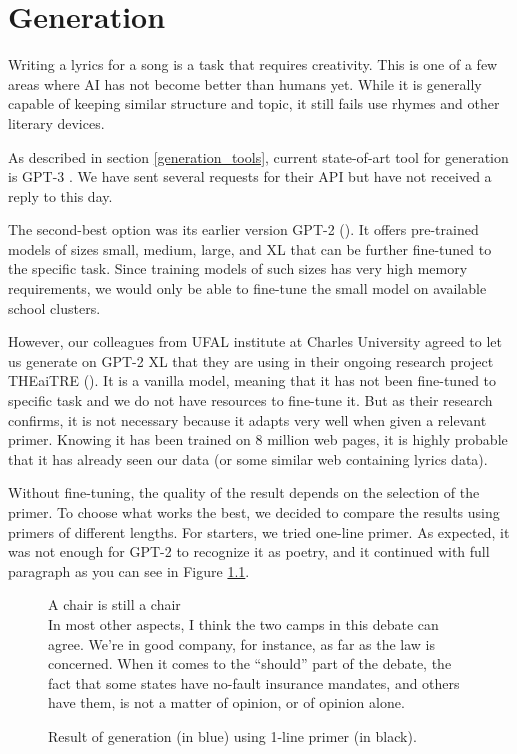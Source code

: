 \chapter{Generation}\label{generation}
Writing a lyrics for a song is a task that requires creativity. This is one of a few areas where AI has not become better than humans yet. While it is generally capable of keeping similar structure and topic, it still fails use rhymes and other literary devices.

As described in section \ref{generation_tools}, current state-of-art tool for generation is GPT-3 \cite{brown2020gpt3}. We have sent several requests for their API but have not received a reply to this day.

The second-best option was its earlier version GPT-2 (\cite{radford2019gpt2}). It offers pre-trained models of sizes small, medium, large, and XL that can be further fine-tuned to the specific task. Since training models of such sizes has very high memory requirements, we would only be able to fine-tune the small model on available school clusters. 

However, our colleagues from UFAL institute at Charles University agreed to let us generate on GPT-2 XL that they are using in their ongoing research project THEaiTRE (\cite{rosa2021theaitre}). It is a vanilla model, meaning that it has not been fine-tuned to specific task and we do not have resources to fine-tune it. But as their research confirms, it is not necessary because it adapts very well when given a relevant primer. Knowing it has been trained on 8 million web pages, it is highly probable that it has already seen our data (or some similar web containing lyrics data). 

Without fine-tuning, the quality of the result depends on the selection of the primer. To choose what works the best, we decided to compare the results using primers of different lengths. For starters, we tried one-line primer. As expected, it was not enough for GPT-2 to recognize it as poetry, and it continued with full paragraph as you can see in Figure \ref{fig_1line_primer}.

\begin{figure}[htb]\centering
	A chair is still a chair \\
	\color{blue}In most other aspects, I think the two camps in this debate can agree. We're in good company, for instance, as far as the law is concerned. When it comes to the ``should'' part of the debate, the fact that some states have no-fault insurance mandates, and others have them, is not a matter of opinion, or of opinion alone. \\
	\endminipage\hfill
	\caption{Result of generation (in blue) using 1-line primer (in black).} \label{fig_1line_primer}
\end{figure} 

